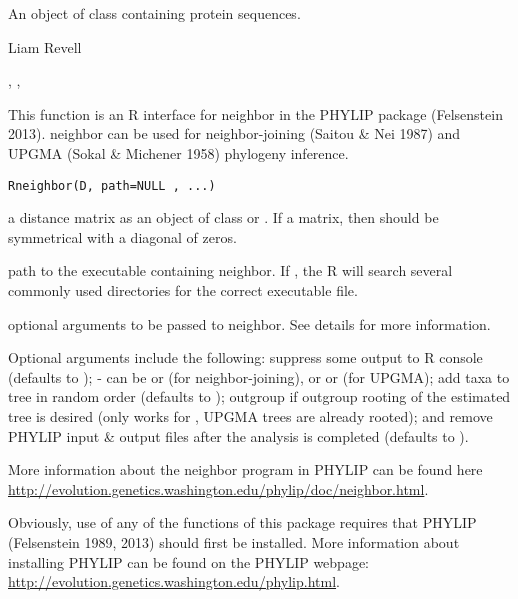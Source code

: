 \documentclass[a4paper]{book}
\begin{document}
%
\begin{Value}
An object of class  containing protein sequences.
\end{Value}
%
\begin{Author}\relax
Liam Revell 
\end{Author}
%
\begin{SeeAlso}\relax
{}, , 
\end{SeeAlso}
%
\begin{Description}\relax
This function is an R interface for neighbor in the PHYLIP package (Felsenstein 2013). neighbor can be used for neighbor-joining (Saitou \& Nei 1987) and UPGMA (Sokal \& Michener 1958) phylogeny inference.
\end{Description}
%
\begin{Usage}
\begin{verbatim}
Rneighbor(D, path=NULL , ...)
\end{verbatim}
\end{Usage}
%
\begin{Arguments}
\begin{ldescription}
\item[\code{D}] a distance matrix as an object of class  or . If a matrix, then  should be symmetrical with a diagonal of zeros.
\item[\code{path}] path to the executable containing neighbor. If , the R will search several commonly used directories for the correct executable file.
\item[\code{...}] optional arguments to be passed to neighbor. See details for more information.
\end{ldescription}
\end{Arguments}
%
\begin{Details}\relax
Optional arguments include the following:  suppress some output to R console (defaults to );  - can be  or  (for neighbor-joining), or  or  (for UPGMA);  add taxa to tree in random order (defaults to );  outgroup if outgroup rooting of the estimated tree is desired (only works for , UPGMA trees are already rooted); and  remove PHYLIP input \& output files after the analysis is completed (defaults to ).

More information about the neighbor program in PHYLIP can be found here \url{http://evolution.genetics.washington.edu/phylip/doc/neighbor.html}.

Obviously, use of any of the functions of this package requires that PHYLIP (Felsenstein 1989, 2013) should first be installed. More information about installing PHYLIP can be found on the PHYLIP webpage: \url{http://evolution.genetics.washington.edu/phylip.html}.
\end{Details}
\end{document}
